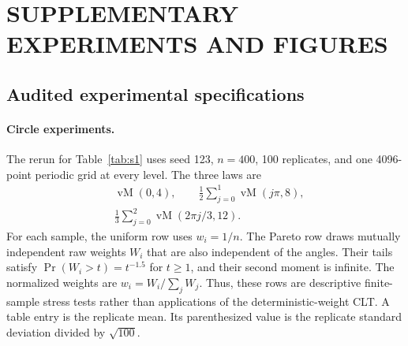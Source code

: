 \documentclass[twoside]{article}
\theoremstyle{definition}
\theoremstyle{remark}
\begin{document}














\appendix


\section{SUPPLEMENTARY EXPERIMENTS AND FIGURES}\label{app:supp_experiments}

\subsection{Audited experimental specifications}
\label{app:experiment_specs}

\paragraph{Circle experiments.}
The rerun for Table~\ref{tab:s1} uses seed 123, $n=400$, 100 replicates, and one 4096-point periodic grid at every level. The three laws are
\[
\begin{aligned}
 &\operatorname{vM}(0,4),\qquad
 \tfrac12\!\sum_{j=0}^1\operatorname{vM}(j\pi,8),\\
 &\tfrac13\!\sum_{j=0}^2\operatorname{vM}(2\pi j/3,12).
\end{aligned}
\]
For each sample, the uniform row uses $w_i=1/n$. The Pareto row draws mutually independent raw weights $W_i$ that are also independent of the angles. Their tails satisfy $\Pr(W_i>t)=t^{-1.5}$ for $t\ge1$, and their second moment is infinite. The normalized weights are $w_i=W_i/\sum_jW_j$. Thus, these rows are descriptive finite-sample stress tests rather than applications of the deterministic-weight CLT. A table entry is the replicate mean. Its parenthesized value is the replicate standard deviation divided by $\sqrt{100}$.
\end{document}
